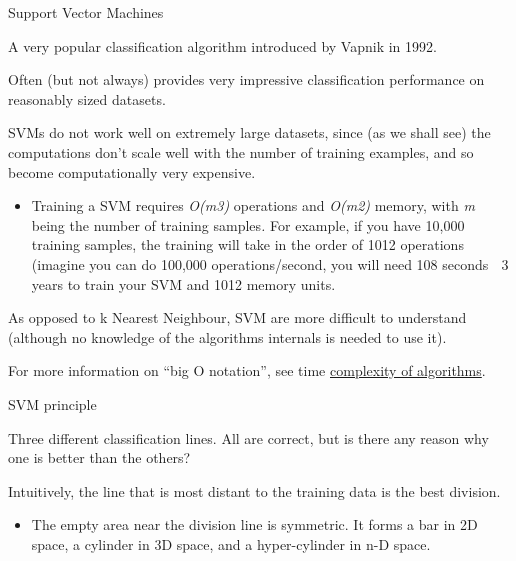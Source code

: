 \documentclass[compress]{beamer}
\begin{document}
\begin{frame}{Support Vector Machines}

A very popular classification algorithm introduced by Vapnik in 1992.

Often (but not always) provides very impressive classification
performance on reasonably sized datasets.

SVMs do not work well on extremely large datasets, since (as we shall
see) the computations don't scale well with the number of training
examples, and so become computationally very expensive.

\begin{itemize}

\item
  Training a SVM requires \emph{O(m3)} operations and \emph{O(m2)}
  memory, with \emph{m} being the number of training samples\emph{.} For
  example, if you have 10,000 training samples, the training will take
  in the order of 1012 operations (imagine you can do 100,000
  operations/second, you will need 108 seconds  3 years to train your
  SVM and 1012 memory units.
\end{itemize}

As opposed to k Nearest Neighbour, SVM are more difficult to understand
(although no knowledge of the algorithms internals is needed to use it).

For more information on ``big O notation'', see time
\href{https://en.wikipedia.org/wiki/Time_complexity}{complexity of
algorithms}.

\end{frame}

\begin{frame}{SVM principle}

Three different classification lines. All are correct, but is there any
reason why one is better than the others?

Intuitively, the line that is most distant to the training data is the
best division.

\begin{itemize}

\item
  The empty area near the division line is symmetric. It forms a bar in
  2D space, a cylinder in 3D space, and a hyper-cylinder in n-D space.
\end{itemize}

\end{frame}
\end{document}
